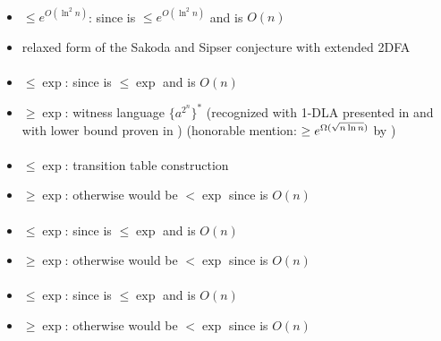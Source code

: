 \paragraph{\TNFA{}\tto\ODLA}
\begin{itemize}
	\item $\le e^{O(\ln^2n)}$: since \hyperref[cost:2NFAto2DFAu]{\TNFA{}\tto\TDFA} is $\le e^{O(\ln^2n)}$ and \TDFA{}\tto\ODLA is $O(n)$
	\item relaxed form of the Sakoda and Sipser conjecture with extended 2DFA
\end{itemize}
\paragraph{\ODLA{}\tto\TNFA}\label{cost:1DLAto2NFAu}
\begin{itemize}
	\item $\le\exp$: since \hyperref[cost:1DLAto1DFAu]{\ODLA{}\tto\ODFA} is $\le\exp$ and \ODFA{}\tto\TNFA is $O(n)$
	\item $\ge\exp$: witness language $\{a^{2^n}\}^*$ (recognized with 1-DLA presented in \cite{PigPri19} and with \TNFA lower bound proven in \cite{MerPig00}) (honorable mention: $\ge e^{\Omega(\sqrt{n\ln n})}$ by \cite{KutPig+18})
\end{itemize}
\paragraph{\ODLA{}\tto\ODFA}\label{cost:1DLAto1DFAu}
\begin{itemize}
	\item $\le\exp$: transition table construction \cite{PigPis14}
	\item $\ge\exp$: otherwise \hyperref[cost:1DLAto2NFAu]{\ODLA{}\tto\TNFA} would be $<\exp$ since \ODFA{}\tto\TNFA is $O(n)$
\end{itemize}
\paragraph{\ODLA{}\tto\ONFA}\label{cost:1LAto1NFAu}
\begin{itemize}
	\item $\le\exp$: since \hyperref[cost:1DLAto1DFAu]{\ODLA{}\tto\ODFA} is $\le\exp$ and \ODFA{}\tto\ONFA is $O(n)$
	\item $\ge\exp$: otherwise \hyperref[cost:1DLAto2NFAu]{\ODLA{}\tto\TNFA} would be $<\exp$ since \ONFA{}\tto\TNFA is $O(n)$
\end{itemize}
\paragraph{\ODLA{}\tto\TDFA}\label{cost:1DLAto2DFAu}
\begin{itemize}
	\item $\le\exp$: since \hyperref[cost:1DLAto1DFAu]{\ODLA{}\tto\ODFA} is $\le\exp$ and \ODFA{}\tto\TDFA is $O(n)$
	\item $\ge\exp$: otherwise \hyperref[cost:1DLAto2NFAu]{\ODLA{}\tto\TNFA} would be $<\exp$ since \TDFA{}\tto\TNFA is $O(n)$
\end{itemize}
